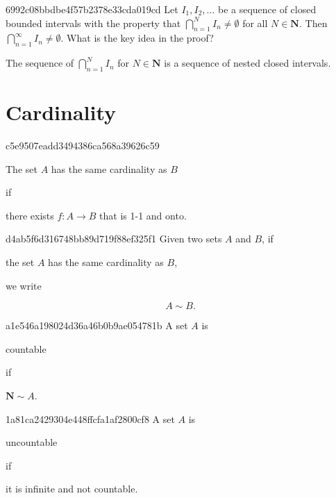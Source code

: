 \begin{note}{6992c08bbdbe4f57b2378e33cda019cd}
    Let \({ I_1, I_2, \ldots }\) be a sequence of closed bounded intervals with the property that \({ \bigcap_{n = 1}^{N} I_n \neq \emptyset }\) for all \({ N \in \mathbf{N} }\).
    Then \({ \bigcap_{n = 1}^{\infty} I_n \neq \emptyset }\).
    What is the key idea in the proof?

    \begin{cloze}{1}
        The sequence of \({ \bigcap_{n = 1}^{N} I_n }\) for \({ N \in \mathbf{N} }\) is a sequence of nested closed intervals.
    \end{cloze}
\end{note}

\section{Cardinality}
\begin{note}{c5e9507eadd3494386ca568a39626c59}
    \begin{icloze}{2}The set \({ A }\) has the same cardinality as \({ B }\)\end{icloze} if \begin{icloze}{1}there exists \({ f : A \to B }\) that is 1-1 and onto.\end{icloze}
\end{note}

\begin{note}{d4ab5f6d316748bb89d719f88ef325f1}
    Given two sets \({ A }\) and \({ B }\), if \begin{icloze}{2}the set \({ A }\) has the same cardinality as \({ B }\),\end{icloze} we write
    \begin{icloze}{1}
        \[
            A \sim B.
        \]
    \end{icloze}
\end{note}

\begin{note}{a1e546a198024d36a46b0b9ae054781b}
    A set \({ A }\) is \begin{icloze}{2}countable\end{icloze} if \begin{icloze}{1}\({ \mathbf{N} \sim A }\).\end{icloze}
\end{note}

\begin{note}{1a81ca2429304e448ffcfa1af2800cf8}
    A set \({ A }\) is \begin{icloze}{2}uncountable\end{icloze} if \begin{icloze}{1}it is infinite and not countable.\end{icloze}
\end{note}

